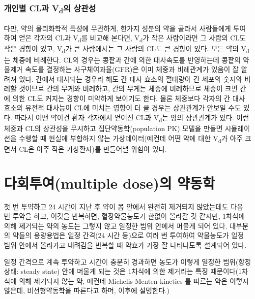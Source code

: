 \documentclass[
  11pt,
  krantz2, a4paper, twoside]{krantz}
\begin{document}
\hypertarget{uxac1cuxc778uxbcc4-cluxacfc-vduxc758-uxc0c1uxad00uxc131}{%
\subsubsection{\texorpdfstring{개인별 CL과 V\textsubscript{d}의 상관성}{개인별 CL과 Vd의 상관성}}\label{uxac1cuxc778uxbcc4-cluxacfc-vduxc758-uxc0c1uxad00uxc131}}

다만, 약의 물리화학적 특성에 무관하게, 한가지 성분의 약을 골라서
사람들에게 투여하여 얻은 각자의 CL과 V\textsubscript{d}를 비교해 본다면, V\textsubscript{d}가 작은
사람이라면 그 사람의 CL도 작은 경향이 있고, V\textsubscript{d}가 큰 사람에서는 그
사람의 CL도 큰 경향이 있다. 모든 약의 V\textsubscript{d}는 체중에 비례한다. CL의
경우는 콩팥과 간에 의한 대사속도를 반영하는데 콩팥의 약물제거 속도를
결정하는 사구체여과율(GFR)은 이미 체중과 비례관계가 있음이 잘 알려져
있다. 간에서 대사되는 경우라 해도 간 대사 효소의 절대량이 간 세포의
숫자와 비례할 것이므로 간의 무게와 비례하고, 간의 무게는 체중에
비례하므로 체중이 크면 간에 의한 CL도 커지는 경향이 미약하게 보이기도
한다. 물론 체중보다 각자의 간 대사 효소의 유전적 대사능이 CL에 미치는
영향이 더 클 경우는 상관관계가 안보일 수도 있다. 따라서 어떤 약이건 환자
각자에서 얻어진 CL과 V\textsubscript{d}는 양의 상관관계가 있다. 이런 체중과 CL의
상관성을 무시하고 집단약동학(population PK) 모델을 만들면 시뮬레이션을
수행할 때 현실에 부합하지 않는 가상데이터(예컨데 어떤 약에 대한 V\textsubscript{d}가
아주 크면서 CL은 아주 작은 가상환자)를 만들어낼 위험이 있다.

\hypertarget{uxb2e4uxd68cuxd22cuxc5ecmultiple-doseuxc758-uxc57duxb3d9uxd559}{%
\section{다회투여(multiple dose)의 약동학}\label{uxb2e4uxd68cuxd22cuxc5ecmultiple-doseuxc758-uxc57duxb3d9uxd559}}

첫 번 투약하고 24 시간이 지난 후 약이 몸 안에서 완전히 제거되지 않았는데도 다음 번 투약을 하고, 이것을 반복하면, 혈장약물농도가 한없이 올라갈 것 같지만, 1차식에 의해 제거되는 약의 농도는 그렇지 않고 일정한 범위 안에서 머물게 되어 있다.
대부분의 약들의 용량용법은 일정 간격(24 시간 등)으로 여러 번 투여하여 약물농도가 일정 범위 안에서 올라가고 내려감을 반복할 때 약효가 가장 잘 나타나도록 설계되어 있다.

일정 간격으로 계속 투약하고 시간이 충분히 경과하면 농도가 이렇게 일정한 범위(항정상태: steady state) 안에 머물게 되는 것은 1차식에 의한 제거라는 특징 때문이다(1차식에 의해 제거되지 않는 약, 예컨데 Michelis-Menten kinetics 를 따르는 약은 이렇지 않은데, 비선형약동학을 따른다고 하며, 이후에 설명한다.)
\end{document}
